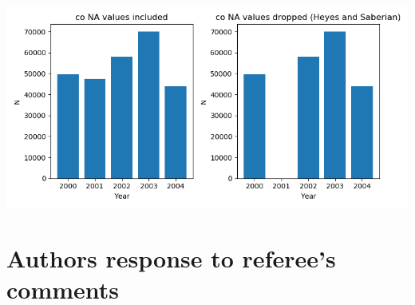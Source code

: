\documentclass[11pt]{article}
\begin{document}
\begin{subappendices}
		\begin{center}
		 \label{tab:title} 
		{
		\includegraphics[scale=0.85]{double_plot_year_dist_with_and_whithout_co.png}	
		}
		\end{center}		
		
		
	\end{subappendices}	
	
	
	\newpage
	\section{Authors response to referee's comments}
	
	\newpage
	{\footnotesize 
		
		\singlespacing
		
	}
	
	
\end{document}
